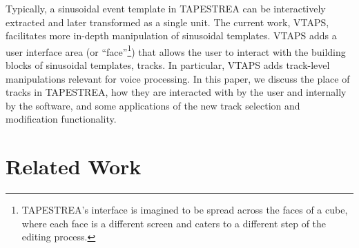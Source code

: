 \documentclass{article}
\begin{document}
Typically, a sinusoidal event template in TAPESTREA can be interactively extracted and later transformed 
as a single unit. The current work, VTAPS, facilitates more in-depth manipulation of sinusoidal templates. VTAPS adds a user interface area (or ``face''\footnote{TAPESTREA's interface is
imagined to be spread across the faces of a cube, where each face is a
different screen and caters to a different step of the editing process.}) that allows the user to 
interact with the building blocks of sinusoidal templates, tracks. In particular, VTAPS adds 
track-level manipulations relevant for voice processing. In this paper, we  
discuss the place of tracks in TAPESTREA, how they are interacted with by the user and 
internally by the software, and some applications of the new track selection and 
modification functionality. 





\section{Related Work}

\end{document}
